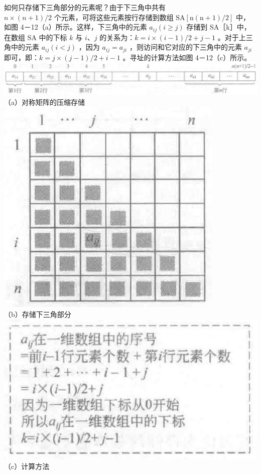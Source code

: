 \documentclass[10pt]{article}
\begin{document}
如何只存储下三角部分的元素呢？由于下三角中共有\\
$n \times(n+1) / 2$ 个元素，可将这些元素按行存储到数组 $\mathrm{SA}[\mathrm{n}(\mathrm{n}+1) / 2]$ 中，如图 4－12（a）所示。这样，下三角中的元素 $a_{i j}(i \geqslant j)$ 存储到 SA［k］中，在数组 SA 中的下标 $k$ 与 $i 、 j$ 的关系为：$k=i \times(i-1) / 2+j-1$ 。对于上三角中的元素 $a_{i j}(i<j)$ ，因为 $a_{i j}=a_{j i}$ ，则访问和它对应的下三角中的元素 $a_{j i}$ 即可，即：$k=j \times(j-1) / 2+i-1$ 。寻址的计算方法如图 4－12（c）所示。\\
\includegraphics[max width=\textwidth, center]{2025_06_06_704745ea57b15b2333e5g-123(1)}\\
（a）对称矩阵的压缩存储\\
\includegraphics[max width=\textwidth, center]{2025_06_06_704745ea57b15b2333e5g-123(2)}\\
（b）存储下三角部分\\
\includegraphics[max width=\textwidth, center]{2025_06_06_704745ea57b15b2333e5g-123}\\
（c）计算方法
\end{document}

